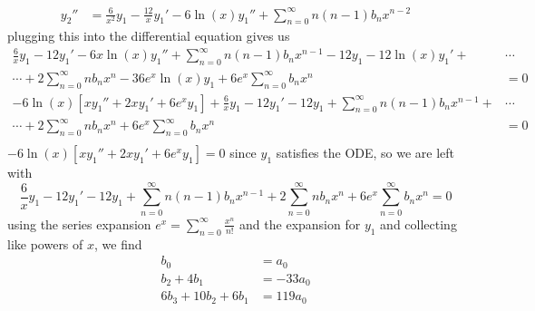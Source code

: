 \documentclass{article}
\begin{document}
\begin{itemize}
\begin{itemize}
\begin{itemize}
\begin{align*}
                y_2'' &= \frac{6}{x^2}y_1 - \frac{12}{x}y_1' - 6\ln(x)y_1'' + \sum_{n = 0}^{\infty} n(n-1)b_nx^{n - 2} 
            \end{align*}
            plugging this into the differential equation gives us
            \begin{align*}
                \frac{6}{x}y_1 - 12y_1' - 6x\ln(x)y_1'' + \sum_{n = 0}^{\infty} n(n-1)b_nx^{n-1} - 12y_1 - 12\ln(x)y_1' + &\cdots\\
               \cdots + 2\sum_{n = 0}^{\infty} nb_nx^n - 36e^x\ln(x)y_1 + 6e^x\sum_{n = 0}^{\infty}b_nx^n& = 0\\
               -6\ln(x)[xy_1'' + 2xy_1' + 6e^xy_1] + \frac{6}{x}y_1 - 12y_1' - 12y_1 + \sum_{n = 0}^{\infty} n(n-1)b_nx^{n-1} + &\cdots\\
               \cdots + 2\sum_{n = 0}^{\infty} nb_nx^n +6e^x\sum_{n = 0}^{\infty} b_nx^n& = 0\\
            \end{align*}
            $-6\ln(x)[xy_1'' + 2xy_1' + 6e^xy_1] = 0$ since $y_1$ satisfies the ODE, so we are left with
            \[\frac{6}{x}y_1 - 12y_1' - 12y_1 + \sum_{n = 0}^{\infty} n(n-1)b_nx^{n-1} + 2\sum_{n = 0}^{\infty} nb_nx^n + 6e^x\sum_{n = 0}^{\infty} b_nx^n = 0\]
            using the series expansion $e^x = \sum_{n = 0}^{\infty} \frac{x^n}{n!}$ and the expansion for $y_1$ and collecting like powers of $x$, we find
            \begin{align*}
                b_0 &= a_0\\
                b_2 + 4b_1 &= -33a_0\\
                6b_3 + 10b_2 + 6b_1 &= 119a_0
            \end{align*}
            
        \end{itemize}
    \end{itemize}

    
\end{itemize}
\end{document}
